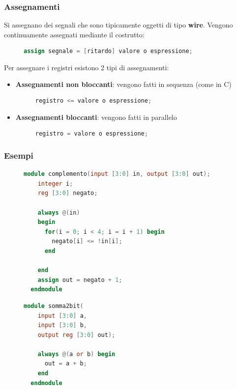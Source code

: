 \documentclass[a4paper]{article}
\theoremstyle{break}
\theoremstyle{break}
\theoremstyle{break}
\theoremstyle{break}
\begin{document}
\subsubsection{Assegnamenti}
Si assegnano dei segnali che sono tipicamente oggetti di tipo \textbf{wire}. Vengono
continuamente assegnati mediante il costrutto:
\begin{figure}[H]
  \begin{lstlisting}[language=Verilog]
  assign segnale = [ritardo] valore o espressione;
  \end{lstlisting}
\end{figure}
Per assegnare i registri esistono 2 tipi di assegnamenti:
\begin{itemize}
  \item \textbf{Assegnamenti non bloccanti}: vengono fatti in sequenza (come in C)
    \begin{figure}[H]
      \begin{lstlisting}[language=Verilog]
  registro <= valore o espressione;
      \end{lstlisting}
    \end{figure}
  \item \textbf{Assegnamenti bloccanti}: vengono fatti in parallelo
    \begin{figure}[H]
      \begin{lstlisting}[language=Verilog]
  registro = valore o espressione;
      \end{lstlisting}
    \end{figure}
\end{itemize}

\subsubsection{Esempi}
\begin{figure}[H]
  \begin{example}
    \begin{lstlisting}[language=Verilog]
  module complemento(input [3:0] in, output [3:0] out);
    integer i;
    reg [3:0] negato;
  
    always @(in)
    begin
      for(i = 0; i < 4; i = i + 1) begin
        negato[i] <= !in[i];
      end
    
    end
    assign out = negato + 1;
  endmodule
    \end{lstlisting}
  \end{example}
\end{figure}
\begin{figure}[H]
  \begin{example}
    \begin{lstlisting}[language=Verilog]
  module somma2bit(
    input [3:0] a,
    input [3:0] b,
    output reg [3:0] out);
    
    always @(a or b) begin
      out = a + b;
    end
  endmodule
    \end{lstlisting}
  \end{example}
\end{figure}
\end{document}
